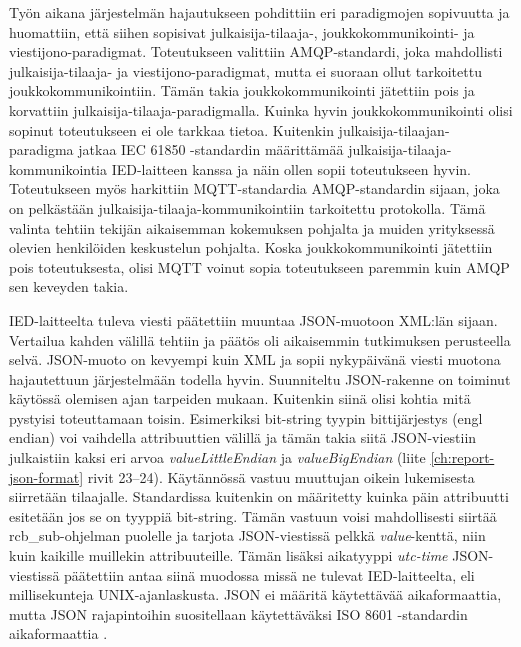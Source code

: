 Työn aikana järjestelmän hajautukseen pohdittiin eri paradigmojen sopivuutta ja huomattiin, että siihen sopisivat julkaisija-tilaaja-, joukkokommunikointi- ja viestijono-paradigmat. Toteutukseen valittiin AMQP-standardi, joka mahdollisti julkaisija-tilaaja- ja viestijono-paradigmat, mutta ei suoraan ollut tarkoitettu joukkokommunikointiin. Tämän takia joukkokommunikointi jätettiin pois ja korvattiin julkaisija-tilaaja-paradigmalla. Kuinka hyvin joukkokommunikointi olisi sopinut toteutukseen ei ole tarkkaa tietoa. Kuitenkin julkaisija-tilaajan-paradigma jatkaa IEC 61850 -standardin määrittämää julkaisija-tilaaja-kommunikointia IED-laitteen kanssa ja näin ollen sopii toteutukseen hyvin. Toteutukseen myös harkittiin MQTT-standardia AMQP-standardin sijaan, joka on pelkästään julkaisija-tilaaja-kommunikointiin tarkoitettu protokolla. Tämä valinta tehtiin tekijän aikaisemman kokemuksen pohjalta ja muiden yrityksessä olevien henkilöiden keskustelun pohjalta. Koska joukkokommunikointi jätettiin pois toteutuksesta, olisi MQTT voinut sopia toteutukseen paremmin kuin AMQP sen keveyden takia.

IED-laitteelta tuleva viesti päätettiin muuntaa JSON-muotoon XML:län sijaan. Vertailua kahden välillä tehtiin ja päätös oli aikaisemmin tutkimuksen perusteella selvä. JSON-muoto on kevyempi kuin XML ja sopii nykypäivänä viesti muotona hajautettuun järjestelmään todella hyvin. Suunniteltu JSON-rakenne on toiminut käytössä olemisen ajan tarpeiden mukaan. Kuitenkin siinä olisi kohtia mitä pystyisi toteuttamaan toisin. Esimerkiksi bit-string tyypin bittijärjestys (engl endian) voi vaihdella attribuuttien välillä ja tämän takia siitä JSON-viestiin julkaistiin kaksi eri arvoa \emph{valueLittleEndian} ja \emph{valueBigEndian} (liite \ref{ch:report-json-format} rivit 23--24). Käytännössä vastuu muuttujan oikein lukemisesta siirretään tilaajalle. Standardissa kuitenkin on määritetty kuinka päin attribuutti esitetään jos se on tyyppiä bit-string. Tämän vastuun voisi mahdollisesti siirtää rcb\_sub-ohjelman puolelle ja tarjota JSON-viestissä pelkkä \emph{value}-kenttä, niin kuin kaikille muillekin attribuuteille. Tämän lisäksi aikatyyppi \emph{utc-time} JSON-viestissä päätettiin antaa siinä muodossa missä ne tulevat IED-laitteelta, eli millisekunteja UNIX-ajanlaskusta. JSON ei määritä käytettävää aikaformaattia, mutta JSON rajapintoihin suositellaan käytettäväksi ISO 8601 -standardin aikaformaattia \cite{json-api-specification}.

